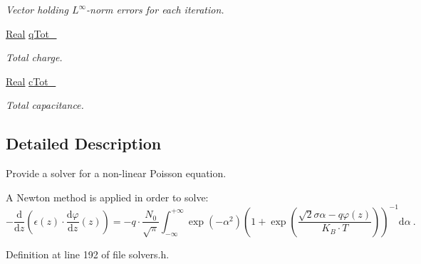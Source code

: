 \begin{DoxyCompactItemize}
\begin{DoxyCompactList}\small\item\em Vector holding $ L^\infty $-\/norm errors for each iteration. \end{DoxyCompactList}\item 
\hypertarget{classNonLinearPoisson1D_a5fa713b8efdf7b2651478e560ae70074}{\hyperlink{typedefs_8h_a060b837c3b4486ee35317744156f3da2}{Real} \hyperlink{classNonLinearPoisson1D_a5fa713b8efdf7b2651478e560ae70074}{q\-Tot\-\_\-}}\label{classNonLinearPoisson1D_a5fa713b8efdf7b2651478e560ae70074}

\begin{DoxyCompactList}\small\item\em Total charge. \end{DoxyCompactList}\item 
\hypertarget{classNonLinearPoisson1D_a4edec5e6395e5a862df829a223323533}{\hyperlink{typedefs_8h_a060b837c3b4486ee35317744156f3da2}{Real} \hyperlink{classNonLinearPoisson1D_a4edec5e6395e5a862df829a223323533}{c\-Tot\-\_\-}}\label{classNonLinearPoisson1D_a4edec5e6395e5a862df829a223323533}

\begin{DoxyCompactList}\small\item\em Total capacitance. \end{DoxyCompactList}\end{DoxyCompactItemize}


\subsection{Detailed Description}
Provide a solver for a non-\/linear Poisson equation. 

A Newton method is applied in order to solve\-: \[ -\frac{\mathrm{d}}{\mathrm{d}z} \left(\epsilon(z) \cdot \frac{\mathrm{d}\varphi}{\mathrm{d}z}(z) \right) = - q \cdot \frac{N_0}{\sqrt{\pi}} \int_{-\infty}^{+\infty} \exp\left(-\alpha^2\right) \left( 1 + \exp\left( \frac{\sqrt{2}\sigma\alpha - q\varphi(z)}{K_B \cdot T} \right) \right)^{-1} \mathrm{d}\alpha ~ . \] 

Definition at line 192 of file solvers.\-h.



